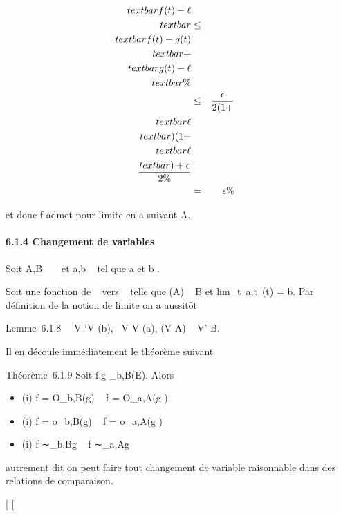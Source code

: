 \documentclass[]{article}
\begin{document}
\begin{align*} \\textbar{}f(t) -
\ell\\textbar{}& \leq& \\textbar{}f(t) -
g(t)\\textbar{} +\\textbar{} g(t) -
\ell\\textbar{}\%& \\ &
\leq& \epsilon \over 2(1 +\\textbar{}
\ell\\textbar{}) (1 +\\textbar{}
\ell\\textbar{}) + \epsilon \over 2 \%&
\\ & =& \epsilon \%&
\\ \end{align*}

et donc f admet \ell pour limite en a suivant A.

\paragraph{6.1.4 Changement de variables}

Soit A,B \subset~ ~ et a,b \in\overline{}~ tel que a
\in\overlineA et b \in\overlineB.

Soit \phi une fonction de ~ vers ~ telle que \phi(A) \subset~ B et
lim\_t\rightarrow~a,t\inA~\phi(t) = b. Par définition
de la notion de limite on a aussitôt

Lemme~6.1.8 \forall~~V `\in V (b),
\exists~V \in V (a), \phi(V \bigcap A) \subset~ V' \bigcap B.

Il en découle immédiatement le théorème suivant

Théorème~6.1.9 Soit f,g \_b,B(E). Alors

\begin{itemize}
\itemsep1pt\parskip0pt
\item
  (i) f = O\_b,B(g) \rigtharrow~ f \cdot \phi = O\_a,A(g \cdot \phi)
\item
  (i) f = o\_b,B(g) \rigtharrow~ f \cdot \phi = o\_a,A(g \cdot \phi)
\item
  (i) f ∼\_b,Bg \rigtharrow~ f \cdot \phi ∼\_a,Ag \cdot \phi
\end{itemize}

autrement dit on peut faire tout changement de variable raisonnable dans
des relations de comparaison.

{[}
{[}
\end{document}
